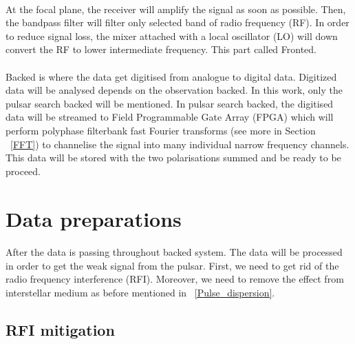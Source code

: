 \documentclass[thesis_msc.tex]{subfiles}
\begin{document}
        \paragraph{} At the focal plane, the receiver will amplify the signal as soon as possible. Then, the bandpass filter will filter only selected band of radio frequency (RF). In order to reduce signal loss, the mixer attached with a local oscillator (LO) will down convert the RF to lower intermediate frequency. This part called Fronted. 
		\paragraph{} Backed is where the data get digitised from analogue to digital data. Digitized data will be analysed depends on the observation backed. In this work, only the pulsar search backed will be mentioned. In pulsar search backed, the digitised data will be streamed to Field Programmable Gate Array (FPGA) which will perform polyphase filterbank fast Fourier transforms (see more in Section ~\ref{FFT}) to channelise the signal into many individual narrow frequency channels. This data will be stored with the two polarisations summed and be ready to be  proceed.  
            \section{Data preparations} 
            \paragraph{} After the data is passing throughout backed system. The data will be processed in order to get the weak signal from the pulsar. First, we need to get rid of the radio frequency interference (RFI). Moreover, we need to remove the effect from interstellar medium as before mentioned in  ~\ref{Pulse_dispersion}.    
            
   \subsection{RFI mitigation} \label{RFI_mit}
\end{document}
